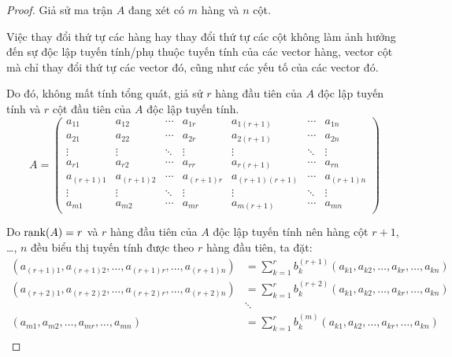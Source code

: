 \documentclass[class=linear-algebra,crop=false]{standalone}
\begin{document}
\begin{proof}
	\par Giả sử ma trận $A$ đang xét có $m$ hàng và $n$ cột.
	\par Việc thay đổi thứ tự các hàng hay thay đổi thứ tự các cột không làm ảnh hưởng đến sự độc lập tuyến tính/phụ thuộc tuyến tính của các vector hàng, vector cột mà chỉ thay đổi thứ tự các vector đó, cũng như các yếu tố của các vector đó.
	\par Do đó, không mất tính tổng quát, giả sử $r$ hàng đầu tiên của $A$ độc lập tuyến tính và $r$ cột đầu tiên của $A$ độc lập tuyến tính.
	\[
		A =
		\begin{pmatrix}
			a_{11}     & a_{12}     & \cdots & a_{1r}     & a_{1(r+1)}     & \cdots & a_{1n}     \\
			a_{21}     & a_{22}     & \cdots & a_{2r}     & a_{2(r+1)}     & \cdots & a_{2n}     \\
			\vdots     & \vdots     & \ddots & \vdots     & \vdots         & \ddots & \vdots     \\
			a_{r1}     & a_{r2}     & \cdots & a_{rr}     & a_{r(r+1)}     & \cdots & a_{rn}     \\
			a_{(r+1)1} & a_{(r+1)2} & \cdots & a_{(r+1)r} & a_{(r+1)(r+1)} & \cdots & a_{(r+1)n} \\
			\vdots     & \vdots     & \ddots & \vdots     & \vdots         & \ddots & \vdots     \\
			a_{m1}     & a_{m2}     & \cdots & a_{mr}     & a_{m(r+1)}     & \cdots & a_{mn}
		\end{pmatrix}
	\]
	\par Do $\text{rank}(A) = r$ và $r$ hàng đầu tiên của $A$ độc lập tuyến tính nên hàng cột $r+1$, \ldots, $n$ đều biểu thị tuyến tính được theo $r$ hàng đầu tiên, ta đặt:
	\begin{align*}
		(a_{(r+1)1}, a_{(r+1)2}, \ldots, a_{(r+1)r}, \ldots, a_{(r+1)n}) & = \sum^{r}_{k=1}b_{k}^{(r+1)}(a_{k1}, a_{k2}, \ldots, a_{kr}, \ldots, a_{kn}) \\
		(a_{(r+2)1}, a_{(r+2)2}, \ldots, a_{(r+2)r}, \ldots, a_{(r+2)n}) & = \sum^{r}_{k=1}b_{k}^{(r+2)}(a_{k1}, a_{k2}, \ldots, a_{kr}, \ldots, a_{kn}) \\
		                                                                 & \ddots                                                                        \\
		(a_{m1}, a_{m2}, \ldots, a_{mr}, \ldots, a_{mn})                 & = \sum^{r}_{k=1}b_{k}^{(m)}(a_{k1}, a_{k2}, \ldots, a_{kr}, \ldots, a_{kn})   \\

\end{align*}
\end{proof}
\end{document}
